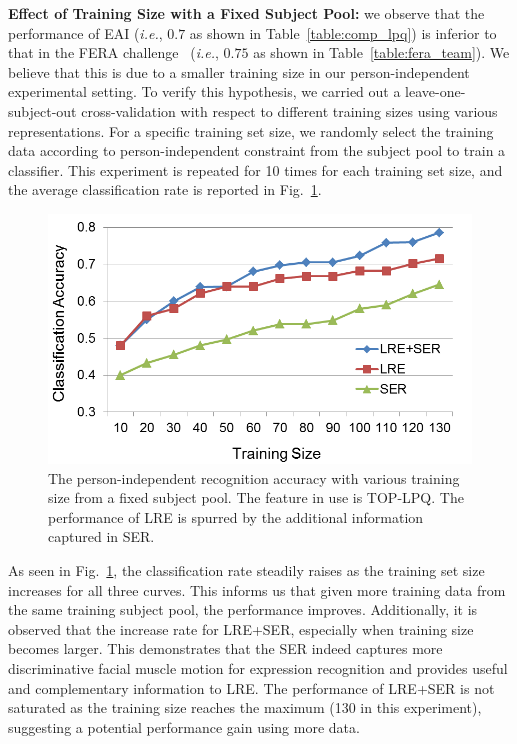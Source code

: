 \documentclass[journal]{IEEEtran}
\begin{document}
\textbf{Effect of Training Size with a Fixed Subject Pool:} we observe that the performance of EAI (\textit{i.e.}, $0.7$ as shown in Table~\ref{table:comp_lpq}) is inferior to that in the FERA challenge~\cite{Yang_SMCB12} (\textit{i.e.}, $0.75$ as shown in Table~\ref{table:fera_team}). We believe that this is due to a smaller training size in our person-independent experimental setting. To verify this hypothesis, we carried out a leave-one-subject-out cross-validation with respect to different training sizes using various representations. For a specific training set size, we randomly select the training data according to person-independent constraint from the subject pool to train a classifier. This experiment is repeated for 10 times for each training set size, and the average classification rate is reported in Fig.~\ref{fig:effect_training_size}. 

\begin{figure}[!h]
	\centering
		\includegraphics[width=.9\columnwidth]{pics/effect_training_size.png}
	\caption{The person-independent recognition accuracy with various training size from a fixed subject pool. The feature in use is TOP-LPQ. The performance of LRE is spurred by the additional information captured in SER.}
	\label{fig:effect_training_size}
\end{figure}

As seen in Fig.~\ref{fig:effect_training_size}, the classification rate steadily raises as the training set size increases for all three curves. This informs us that given more training data from the same training subject pool, the performance improves. Additionally, it is observed that the increase rate for LRE+SER, especially when training size becomes larger. This demonstrates that the SER indeed captures more discriminative facial muscle motion for expression recognition and provides useful and complementary information to LRE. The performance of LRE+SER is not saturated as the training size reaches the maximum (130 in this experiment), suggesting a potential performance gain using more data.
\end{document}
